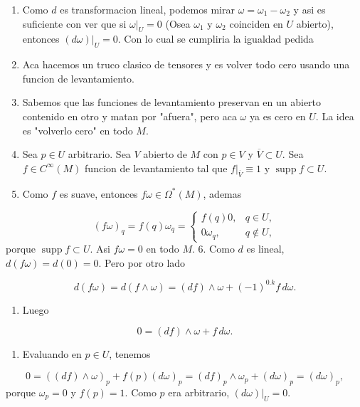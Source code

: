 \begin{bookproof}{}
\begin{enumerate}
\item Como $d$ es transformacion lineal, podemos mirar $\omega=\omega_1-\omega_2$ y asi es suficiente con ver que si $\omega|_U=0$ (Osea $\omega_{1}$ y $\omega_{2}$ coinciden en $U$ abierto), entonces $(d\omega)|_U=0$. Con lo cual se cumpliria la igualdad pedida
\item Aca hacemos un truco clasico de tensores y es volver todo cero usando una funcion de levantamiento.
\item Sabemos que las funciones de levantamiento preservan en un abierto contenido en otro y matan por "afuera", pero aca $\omega$ ya es cero en $U$. La idea es "volverlo cero" en todo $M$.
\item Sea $p\in U$ arbitrario. Sea $V$ abierto de $M$ con $p\in V$ y $\overline V\subset U$. Sea $f\in C^\infty(M)$ funcion de levantamiento tal que $f|_{\overline V}\equiv1$ y $\operatorname{supp}f\subset U$.
\item Como $f$ es suave, entonces $f\omega\in\Omega^*(M)$, ademas
\end{enumerate}
\[
(f\omega)_q=f(q)\omega_q=\begin{cases}f(q)0,&q\in U,\\0\omega_q,&q\notin U,\end{cases}
\]
porque $\operatorname{supp}f\subset U$. Asi $f\omega=0$ en todo $M$. 6. Como $d$ es lineal, $d(f\omega)=d(0)=0$. Pero por otro lado

\[
d(f\omega)=d(f\wedge\omega)=(df)\wedge\omega+(-1)^{0.k} f\,d\omega.
\]
\begin{enumerate}[start=7]
\item Luego
\end{enumerate}
\[
0=(df)\wedge\omega+f\,d\omega.
\]
\begin{enumerate}[start=8]
\item Evaluando en $p\in U$, tenemos
\end{enumerate}
\[
0=((df)\wedge\omega)_p+f(p)(d\omega)_p=(df)_p\wedge\omega_p+(d\omega)_p=(d\omega)_p,
\]
porque $\omega_p=0$ y $f(p)=1$. Como $p$ era arbitrario, $(d\omega)|_U=0$.

\bookqed
\end{bookproof}
\label{blk:ef3cfa}
